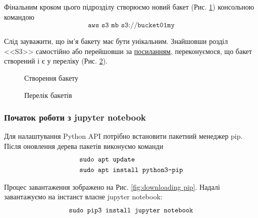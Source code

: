 \documentclass[a4paper,14pt]{extarticle} %
\begin{document}
Фінальним кроком цього підрозділу створюємо новий бакет (Рис. \ref{fig:creation of bucket}) консольною 
командою
\[ \texttt{aws s3 mb s3://bucket01my} \]

Слід зауважити, що ім'я бакету має бути унікальним. Знайшовши розділ <<S3>> 
самостійно або перейшовши за 
\href{https://s3.console.aws.amazon.com/s3/buckets?region=us-east-1}{посиланням}, переконуємося, що бакет 
створений і є у переліку (Рис. \ref{fig:list of buckets}). 

\begin{figure}[H]
    \caption{Створення бакету}
    \label{fig:creation of bucket}
\end{figure}

\begin{figure}[H]
    \caption{Перелік бакетів}
    \label{fig:list of buckets}
\end{figure}

\subsubsection*{Початок роботи з jupyter notebook}

Для налаштування Python API потрібно встановити пакетний менеджер pip. Піс\-ля оновлення дерева пакетів 
виконуємо команди
\begin{align*}
    &\texttt{sudo apt update} \\
    &\text{\texttt{sudo apt install python3-pip}}
\end{align*}

Процес завантаження зображено на Рис. \ref{fig:downloading pip}. Надалі завантажуємо на інстанст власне jupyter notebook:
\[ \text{\texttt{sudo pip3 install jupyter notebook}} \]
\end{document}
